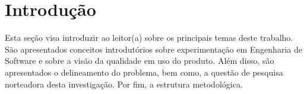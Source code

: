 \chapter{Introdução}   
\label{ch:intro}

Esta seção visa introduzir ao leitor(a) sobre os principais temas deste trabalho. São apresentados conceitos introdutórios sobre experimentação em Engenharia de Software e sobre a visão da qualidade em uso do produto. Além disso, são apresentados o delineamento do problema, bem como, a questão de pesquisa norteadora desta investigação. Por fim, a estrutura metodológica.













